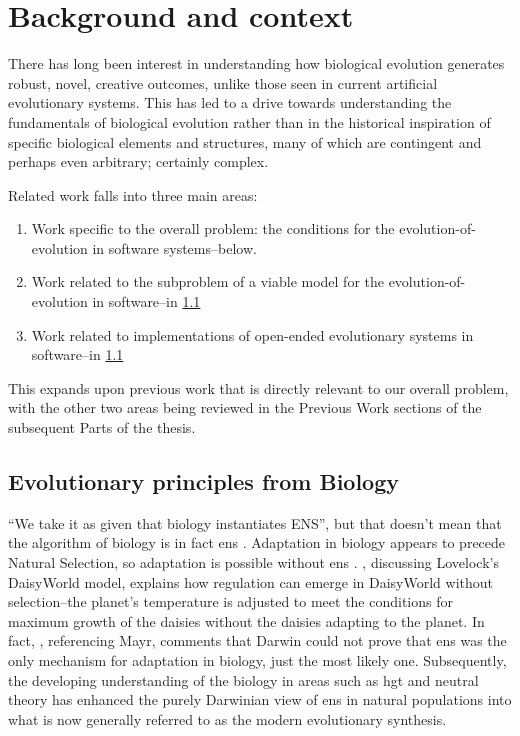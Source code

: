 \section{Background and context}\label{background-and-context}

There has long been interest in understanding how biological evolution generates robust, novel, creative outcomes, unlike those seen in current artificial evolutionary systems. This has led to a drive towards understanding the fundamentals of biological evolution rather than in the historical inspiration of specific biological elements and structures, many of which are contingent and perhaps even arbitrary; certainly complex.

Related work falls into three main areas:

\begin{enumerate}
\item Work specific to the overall problem: the conditions for the evolution-of-evolution in software systems--below.
\item Work related to the subproblem of a viable model for the evolution-of-evolution in software--in \ref{}
\item Work related to implementations of open-ended evolutionary systems in software--in \ref{}
\end{enumerate}
	
This  expands upon previous work that is directly relevant to our overall problem, with the other two areas being reviewed in the Previous Work sections of the subsequent Parts of the thesis. 

\subsection{Evolutionary principles from Biology}

``We take it as given that biology instantiates ENS'', but that doesn't mean that the algorithm of biology is in fact \gls{ens} \parencite{Watson2012}. Adaptation in biology appears to precede Natural Selection, so adaptation is possible without \gls{ens} \cite{Watson2010}. \cite{Saunders1994}, discussing Lovelock's DaisyWorld model, explains how regulation can emerge in DaisyWorld without selection--the planet's temperature is adjusted to meet the conditions for maximum growth of the daisies without the daisies adapting to the planet. In fact, \cite{Saunders1994}, referencing Mayr, comments that Darwin could not prove that \gls{ens} was the only mechanism for adaptation in biology, just the most likely one. Subsequently, the developing understanding of the biology in areas such as \gls{hgt} and neutral theory \cite{Kimura:1968uq} has enhanced the purely Darwinian view of \gls{ens} in natural populations into what is now generally referred to as the modern evolutionary synthesis.

